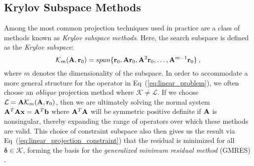 \subsection{Krylov Subspace Methods}
\label{subsec:krylov_methods}
Among the most common projection techniques used in practice are a
class of methods known as \textit{Krylov subspace methods}. Here, the
search subspace is defined as the \textit{Krylov subspace}:
\begin{equation}
  \mathcal{K}_m(\mathbf{A},\mathbf{r}_0) = span\{\mathbf{r}_0, \mathbf{A}\mathbf{r}_0,
  \mathbf{A}^2\mathbf{r}_0, \dots, \mathbf{A}^{m-1}\mathbf{r}_0\}\:,
  \label{eq:krylov_subspace}
\end{equation}
where $m$ denotes the dimensionality of the subspace. In order to
accommodate a more general structure for the operator in
Eq~(\ref{eq:linear_problem}), we often choose an \textit{oblique}
projection method where $\mathcal{K} \neq \mathcal{L}$. If we choose
$\mathcal{L} = \mathbf{A} \mathcal{K}_m(\mathbf{A},\mathbf{r}_0)$, then we are
ultimately solving the normal system $\mathbf{A}^T\mathbf{A}\mathbf{x} =
\mathbf{A}^T\mathbf{b}$ where $\mathbf{A}^T\mathbf{A}$ will be symmetric positive
definite if $\mathbf{A}$ is nonsingular, thereby expanding the range of
operators over which these methods are valid. This choice of
constraint subspace also then gives us the result via
Eq~(\ref{eq:linear_projection_constraint}) that the residual is
minimized for all $\boldsymbol{\delta} \in \mathcal{K}$, forming the
basis for the \textit{generalized minimum residual method} (GMRES)
\cite{saad_gmres:_1986}.

